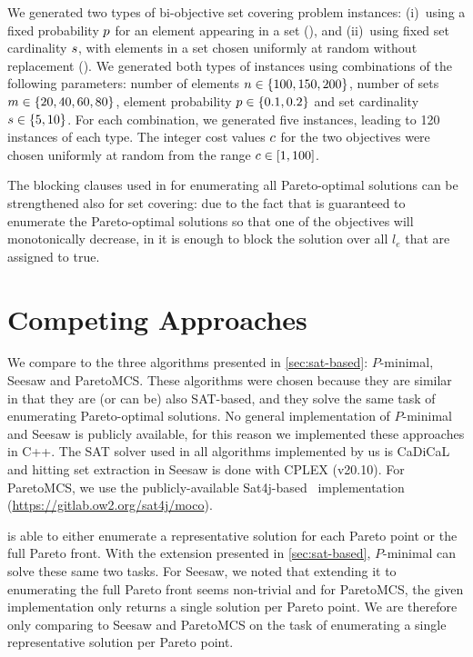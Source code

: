 We generated two types of  bi-objective set covering problem instances:
(i)~using a fixed probability $p$ for an element appearing in a set (\scep{}), and (ii)~using fixed set cardinality $s$, with elements in a set chosen uniformly at random without replacement (\scsc{}).
We generated both types of instances using combinations of the following parameters:
number of elements $n\in\{100,150,200\}$, number of sets $m\in\{20,40,60,80\}$, element probability $p\in\{0.1,0.2\}$ and set cardinality $s\in\{5,10\}$.
For each combination, we generated five instances, leading to 120 instances of each type.
The integer cost values $c$ for the two objectives were chosen uniformly at random from the range $c\in[1,100]$.

The blocking clauses used in \algname{} for enumerating all Pareto-optimal solutions can be strengthened also for set covering:
due to the fact that \algname{} is guaranteed to enumerate the Pareto-optimal solutions so that one of the objectives will monotonically decrease, in \algname{} it is enough to block the solution over all $l_e$ that are assigned to true.

\section{Competing Approaches\label{sec:competing}}

We compare \algname{} to the three algorithms presented in \cref{sec:sat-based}: $P$-minimal, Seesaw and ParetoMCS.
These algorithms were chosen because they are similar in that they are (or can be) also SAT-based, and they solve the same task of enumerating Pareto-optimal solutions.
No general implementation of $P$-minimal and Seesaw is publicly available, for this reason we implemented these approaches in C++.
The SAT solver used in all algorithms implemented by us is CaDiCaL~\autocite{BiereFazekasFleuryHeisinger-SAT-Competition-2020-solvers} and hitting set extraction in Seesaw is done with CPLEX (v20.10).
For ParetoMCS, we use the publicly-available Sat4j-based~\autocite{DBLP:journals/jsat/BerreP10} implementation ({\small\url{https://gitlab.ow2.org/sat4j/moco}}).

\algname{} is able to either enumerate a representative solution for each Pareto point or the full Pareto front.
With the extension presented in \cref{sec:sat-based}, $P$-minimal can solve these same two tasks.
For Seesaw, we noted that extending it to enumerating the full Pareto front seems non-trivial and for ParetoMCS, the given implementation only returns a single solution per Pareto point.
We are therefore only comparing to Seesaw and ParetoMCS on the task of enumerating a single representative solution per Pareto point.

